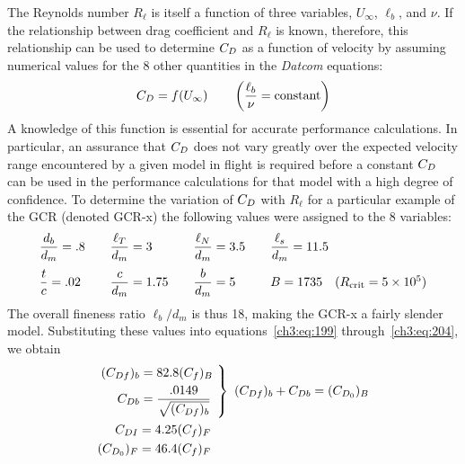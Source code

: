 The Reynolds number $R_\ell$ is itself a function of three variables, $U_\infty$, $\ell_b$, and
$\nu$. If the relationship between drag coefficient and $R_\ell$ is known, therefore, this
relationship can be used to determine $C_{D}$ as a function of velocity by assuming numerical values
for the 8 other quantities in the \emph{Datcom} equations:
\begin{equation}\label{ch3:eq:206}
C_{D} = f(U_\infty) \qquad \left(\frac{\ell_b}{\nu} = \text{constant}\right)
\end{equation}
A knowledge of this function is essential for accurate performance calculations. In particular,
an assurance that $C_{D}$ does not vary greatly over the expected velocity range encountered by a
given model in flight is required before a constant $C_{D}$ can be used in the performance
calculations for that model with a high degree of confidence. To determine the variation of $C_{D}$
with $R_\ell$ for a particular example of the GCR (denoted GCR-x) the following values were
assigned to the 8 variables:
\begin{equation*}
\begin{array}{l@{\qquad}l@{\qquad}l@{\qquad}l}
\dfrac{d_b}{d_m} = .8 & \dfrac{\ell_T}{d_m} = 3 & \dfrac{\ell_N}{d_m} = 3.5
  & \dfrac{\ell_s}{d_m} = 11.5\\[2.5ex]
\dfrac{t}{c} = .02 & \dfrac{c}{d_m} = 1.75 & \dfrac{b}{d_m} = 5
  & B = 1735 \quad (R_{\mathrm{crit}} = 5 \times 10^{5})
\end{array}
\end{equation*}
The overall fineness ratio $\ell_b/d_m$ is thus 18, making the GCR-x a fairly slender model.
Substituting these values into equations~\eqref{ch3:eq:199} through~\eqref{ch3:eq:204}, we
obtain
\begin{equation*}
\begin{aligned}
&\left.\begin{aligned}
(C_{Df})_b &= 82.8(C_f)_B\\
C_{Db} &= \frac{.0149}{\sqrt{(C_{Df})_b}}
\end{aligned}\ \right\}\ (C_{Df})_b + C_{Db} = (C_{D_0})_B\\
&\begin{aligned}
C_{DI} &= 4.25(C_f)_F\\
(C_{D_0})_F &= 46.4(C_f)_F
\end{aligned}
\end{aligned}
\end{equation*}
